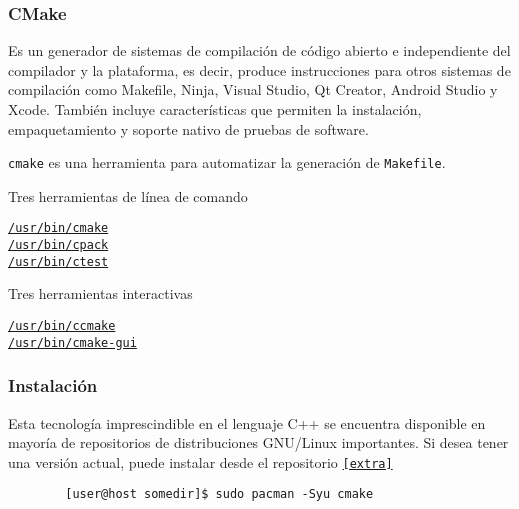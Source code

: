 




\begin{frame}[fragile]
	\frametitle{CMake}
	Es un generador de sistemas de compilación de código abierto e
	independiente del compilador y la plataforma, es decir, produce
	instrucciones para otros sistemas de compilación como Makefile,
	Ninja, Visual Studio, Qt Creator, Android Studio y Xcode.
	También incluye características que permiten la instalación,
	empaquetamiento y soporte nativo de pruebas de software.

	\lstinline{cmake} es una herramienta para automatizar la
	generación de \lstinline{Makefile}.

	Tres herramientas de línea de comando

	\begin{description}
		\item[\href{https://man.archlinux.org/man/cmake.1}{\lstinline{/usr/bin/cmake}}]

		\item[\href{https://man.archlinux.org/man/cpack.1}{\lstinline{/usr/bin/cpack}}]

		\item[\href{https://man.archlinux.org/man/ctest.1}{\lstinline{/usr/bin/ctest}}]
	\end{description}

	Tres herramientas interactivas

	\begin{description}
		\item[\href{https://man.archlinux.org/man/ccmake.1}{\lstinline{/usr/bin/ccmake}}]

		\item[\href{https://man.archlinux.org/man/cmake-gui.1}{\lstinline{/usr/bin/cmake-gui}}]
	\end{description}

\end{frame}

\begin{frame}
	\frametitle{Instalación}
	Esta tecnología imprescindible en el lenguaje C++ se encuentra
	disponible en mayoría de repositorios de distribuciones
	GNU/Linux importantes.
	Si desea tener una versión actual, puede instalar desde el
	repositorio \href{https://archlinux.org/packages/extra/x86_64/cmake}{\lstinline{[extra]}}

	\begin{verbatim}
		[user@host somedir]$ sudo pacman -Syu cmake
	\end{verbatim}

\end{frame}

